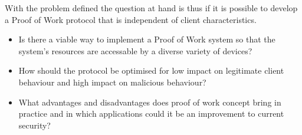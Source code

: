 With the problem defined the question at hand is thus if it is possible to develop a Proof of Work protocol that is independent of client characteristics.
\begin{itemize}
\item Is there a viable way to implement a Proof of Work system so that the system's resources are accessable by a diverse variety of devices?

\item How should the protocol be optimised for low impact on legitimate client behaviour and high impact on malicious behaviour?

\item What advantages and disadvantages does proof of work concept bring in practice and in which applications could it be an improvement to current security?
\end{itemize}